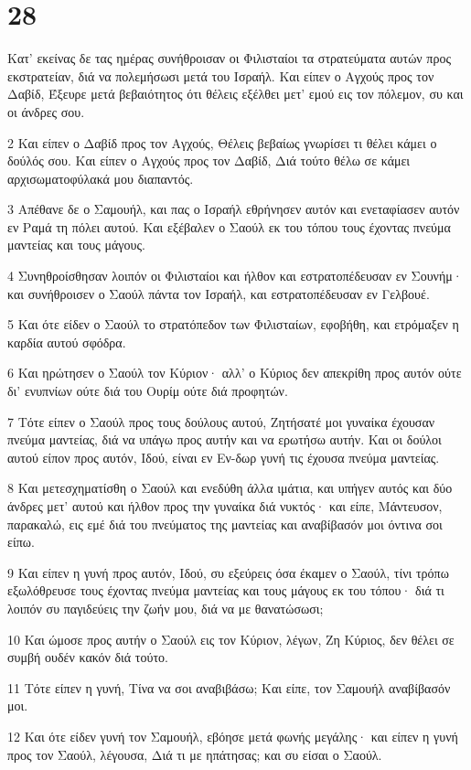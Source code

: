 \chapter{28}

\par Κατ' εκείνας δε τας ημέρας συνήθροισαν οι Φιλισταίοι τα στρατεύματα αυτών προς εκστρατείαν, διά να πολεμήσωσι μετά του Ισραήλ. Και είπεν ο Αγχούς προς τον Δαβίδ, Έξευρε μετά βεβαιότητος ότι θέλεις εξέλθει μετ' εμού εις τον πόλεμον, συ και οι άνδρες σου.
\par 2 Και είπεν ο Δαβίδ προς τον Αγχούς, Θέλεις βεβαίως γνωρίσει τι θέλει κάμει ο δούλός σου. Και είπεν ο Αγχούς προς τον Δαβίδ, Διά τούτο θέλω σε κάμει αρχισωματοφύλακά μου διαπαντός.
\par 3 Απέθανε δε ο Σαμουήλ, και πας ο Ισραήλ εθρήνησεν αυτόν και ενεταφίασεν αυτόν εν Ραμά τη πόλει αυτού. Και εξέβαλεν ο Σαούλ εκ του τόπου τους έχοντας πνεύμα μαντείας και τους μάγους.
\par 4 Συνηθροίσθησαν λοιπόν οι Φιλισταίοι και ήλθον και εστρατοπέδευσαν εν Σουνήμ· και συνήθροισεν ο Σαούλ πάντα τον Ισραήλ, και εστρατοπέδευσαν εν Γελβουέ.
\par 5 Και ότε είδεν ο Σαούλ το στρατόπεδον των Φιλισταίων, εφοβήθη, και ετρόμαξεν η καρδία αυτού σφόδρα.
\par 6 Και ηρώτησεν ο Σαούλ τον Κύριον· αλλ' ο Κύριος δεν απεκρίθη προς αυτόν ούτε δι' ενυπνίων ούτε διά του Ουρίμ ούτε διά προφητών.
\par 7 Τότε είπεν ο Σαούλ προς τους δούλους αυτού, Ζητήσατέ μοι γυναίκα έχουσαν πνεύμα μαντείας, διά να υπάγω προς αυτήν και να ερωτήσω αυτήν. Και οι δούλοι αυτού είπον προς αυτόν, Ιδού, είναι εν Εν-δωρ γυνή τις έχουσα πνεύμα μαντείας.
\par 8 Και μετεσχηματίσθη ο Σαούλ και ενεδύθη άλλα ιμάτια, και υπήγεν αυτός και δύο άνδρες μετ' αυτού και ήλθον προς την γυναίκα διά νυκτός· και είπε, Μάντευσον, παρακαλώ, εις εμέ διά του πνεύματος της μαντείας και αναβίβασόν μοι όντινα σοι είπω.
\par 9 Και είπεν η γυνή προς αυτόν, Ιδού, συ εξεύρεις όσα έκαμεν ο Σαούλ, τίνι τρόπω εξωλόθρευσε τους έχοντας πνεύμα μαντείας και τους μάγους εκ του τόπου· διά τι λοιπόν συ παγιδεύεις την ζωήν μου, διά να με θανατώσωσι;
\par 10 Και ώμοσε προς αυτήν ο Σαούλ εις τον Κύριον, λέγων, Ζη Κύριος, δεν θέλει σε συμβή ουδέν κακόν διά τούτο.
\par 11 Τότε είπεν η γυνή, Τίνα να σοι αναβιβάσω; Και είπε, τον Σαμουήλ αναβίβασόν μοι.
\par 12 Και ότε είδεν γυνή τον Σαμουήλ, εβόησε μετά φωνής μεγάλης· και είπεν η γυνή προς τον Σαούλ, λέγουσα, Διά τι με ηπάτησας; και συ είσαι ο Σαούλ.
